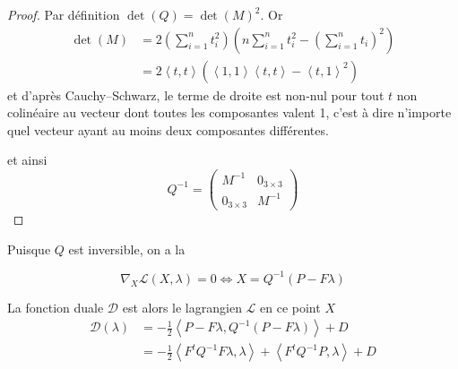 \begin{proof}
Par définition $ \det(Q) = \det(M)^2$. Or 
  \begin{align}
  \det(M) &= 2\left(\sum_{i=1}^n t_i^2\right)\left( n \sum_{i=1}^n t_i^2 - \left(\sum_{i=1}^n t_i\right)^2\right) \\
  &= 2\left<t,t\right>\left( \left<1,1\right> \left<t,t\right> - \left<t,1\right>^2\right)
  \end{align}
  et d'après Cauchy–Schwarz, le terme de droite est non-nul pour tout $t$ non colinéaire au vecteur dont toutes les composantes valent 1, c'est à dire n'importe quel vecteur ayant au moins  deux composantes différentes.


et ainsi
\begin{equation}
Q^{-1} =
\begin{pmatrix}
M^{-1} & 0_{3 \times 3} \\
0_{3 \times 3} & M^{-1}
\end{pmatrix}
\end{equation}

\end{proof}
Puisque $Q$ est inversible, on a la 
\begin{prop}
\begin{equation}
\nabla_X\mathcal{L}(X,\lambda) = 0 \Leftrightarrow X = Q^{-1}\left(P - F\lambda \right)
\end{equation}
\end{prop}


La fonction duale $\mathcal D$ est alors le lagrangien $\mathcal L$ en ce point $X$
\begin{align}
\mathcal D (\lambda) &= -\frac{1}{2} \left<P - F\lambda , Q^{-1}\left(P - F\lambda \right) \right > + D\\
&= -\frac{1}{2}\left<F^tQ^{-1}F\lambda,\lambda\right> + \left<F^tQ^{-1}P,\lambda\right> + D
\end{align}


